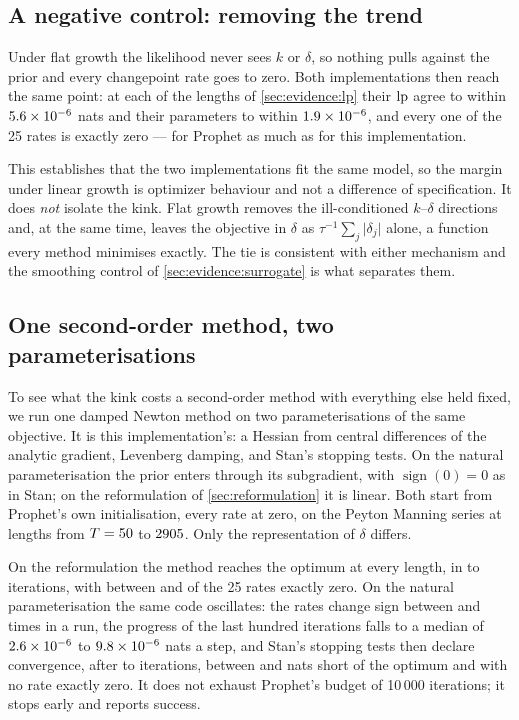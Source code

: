 \subsection{A negative control: removing the trend}
\label{sec:evidence:flat}

Under flat growth the likelihood never sees $k$ or $\delta$, so nothing pulls
against the prior and every changepoint rate goes to zero. Both implementations
then reach the same point: at each of the \FlatLengths{} lengths of
\cref{sec:evidence:lp} their $\mathrm{lp}$ agree to within $5.6\times10^{-6}$ nats and their
parameters to within $1.9\times10^{-6}$, and every one of the 25 rates is exactly zero
--- for Prophet as much as for this implementation.

This establishes that the two implementations fit the same model, so the margin
under linear growth is optimizer behaviour and not a difference of specification.
It does \emph{not} isolate the kink. Flat growth removes the ill-conditioned
$k$--$\delta$ directions and, at the same time, leaves the objective in $\delta$ as
$\tau^{-1}\sum_j\lvert\delta_j\rvert$ alone, a function every method minimises
exactly. The tie is consistent with either mechanism and the smoothing control of
\cref{sec:evidence:surrogate} is what separates them.

\subsection{One second-order method, two parameterisations}
\label{sec:evidence:newton}

To see what the kink costs a second-order method with everything else held fixed,
we run one damped Newton method on two parameterisations of the same objective. It
is this implementation's: a Hessian from central differences of the analytic
gradient, Levenberg damping, and Stan's stopping tests. On the natural
parameterisation the prior enters through its subgradient, with
$\operatorname{sign}(0) = 0$ as in Stan; on the reformulation of
\cref{sec:reformulation} it is linear. Both start from Prophet's own
initialisation, every rate at zero, on the Peyton Manning series at
\NewtonLengths{} lengths from $T = 50$ to $2905$. Only the
representation of $\delta$ differs.

On the reformulation the method reaches the optimum at every length, in
\NewtonSplitIterMin{} to \NewtonSplitIterMax{} iterations, with between
\NewtonSplitZerosMin{} and \NewtonSplitZerosMax{} of the 25 rates exactly zero. On
the natural parameterisation the same code oscillates: the rates change sign
between \NewtonFlipsMin{} and \NewtonFlipsMax{} times in a run, the progress of the
last hundred iterations falls to a median of $2.6\times10^{-6}$ to
$9.8\times10^{-6}$ nats a step, and Stan's stopping tests then declare
convergence, after \NewtonIterMin{} to \NewtonIterMax{} iterations, between
\NewtonShortMin{} and \NewtonShortMax{} nats short of the optimum and with no rate
exactly zero. It does not exhaust Prophet's budget of 10\,000 iterations; it stops
early and reports success.

